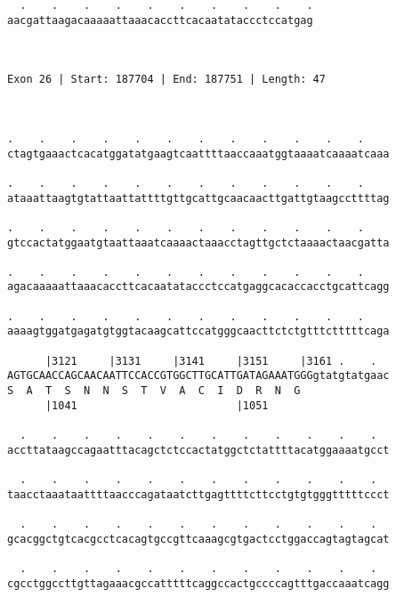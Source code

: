 \documentclass{article}
\begin{document}
\begin{Verbatim}
  .    .    .    .    .    .    .    .    .    .
aacgattaagacaaaaattaaacaccttcacaatataccctccatgag
                                                
                                                
 
Exon 26 | Start: 187704 | End: 187751 | Length: 47



.    .    .    .    .    .    .    .    .    .    .    .    
ctagtgaaactcacatggatatgaagtcaattttaaccaaatggtaaaatcaaaatcaaa
                                                            
.    .    .    .    .    .    .    .    .    .    .    .    
ataaattaagtgtattaattattttgttgcattgcaacaacttgattgtaagccttttag
                                                            
.    .    .    .    .    .    .    .    .    .    .    .    
gtccactatggaatgtaattaaatcaaaactaaacctagttgctctaaaactaacgatta
                                                            
.    .    .    .    .    .    .    .    .    .    .    .    
agacaaaaattaaacaccttcacaatataccctccatgaggcacaccacctgcattcagg
                                                            
.    .    .    .    .    .    .    .    .    .    .    .    
aaaagtggatgagatgtggtacaagcattccatgggcaacttctctgtttctttttcaga
                                                            
      |3121     |3131     |3141     |3151     |3161 .    .  
AGTGCAACCAGCAACAATTCCACCGTGGCTTGCATTGATAGAAATGGGgtatgtatgaac
S  A  T  S  N  N  S  T  V  A  C  I  D  R  N  G              
      |1041                         |1051                   
  
  .    .    .    .    .    .    .    .    .    .    .    .  
accttataagccagaatttacagctctccactatggctctattttacatggaaaatgcct
                                                            
  .    .    .    .    .    .    .    .    .    .    .    .  
taacctaaataattttaacccagataatcttgagttttcttcctgtgtgggtttttccct
                                                            
  .    .    .    .    .    .    .    .    .    .    .    .  
gcacggctgtcacgcctcacagtgccgttcaaagcgtgactcctggaccagtagtagcat
                                                            
  .    .    .    .    .    .    .    .    .    .    .    .  
cgcctggccttgttagaaacgccatttttcaggccactgccccagtttgaccaaatcagg
                                                            

\end{Verbatim}
\end{document}
